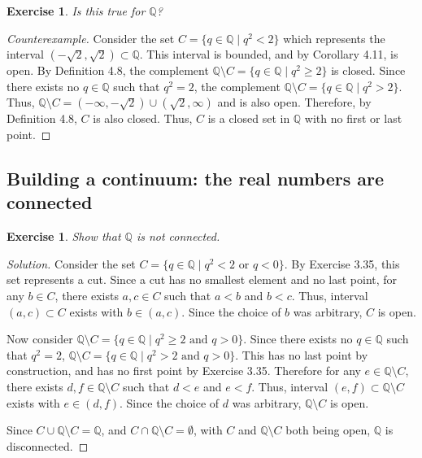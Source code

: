 \documentclass{amsart}
\newtheorem{exercise}[theorem]{Exercise}
\newcommand{\Q}{\mathbb Q}
\newcommand{\1}{\mathds{1}}
\numberwithin{equation}{section}
\numberwithin{theorem}{section}
\begin{document}
\begin{exercise}  Is this true for $\mathbb{Q}$?
\end{exercise}

\begin{proof}[Counterexample]
	Consider the set $C = \{q\in \Q \mid q^2 < 2\}$ which represents the interval $(-\sqrt{2},\sqrt{2}) \subset \Q$. This interval is bounded, and by Corollary 4.11, is open. By Definition 4.8, the complement $\Q\setminus C = \{q\in \Q \mid q^2 \ge 2\}$ is closed. Since there exists no $q\in \Q$ such that $q^2 = 2$, the complement $\Q\setminus C = \{q\in \Q \mid q^2 > 2\}$. Thus, $\Q\setminus C = (-\infty, -\sqrt{2}) \cup (\sqrt{2},\infty)$ and is also open. Therefore, by Definition 4.8, $C$ is also closed. Thus, $C$ is a closed set in $\Q$ with no first or last point. 
\end{proof}

\subsection{Building a continuum: the real numbers are connected}

\begin{exercise}
	Show that $\Q$ is not connected.
\end{exercise}

\begin{proof}[Solution]
	Consider the set $C = \{q\in \Q \mid q^2 < 2 \text{ or } q<0 \}$. By Exercise 3.35, this set represents a cut. Since a cut has no smallest element and no last point, for any $b\in C$, there exists $a,c\in C$ such that $a<b$ and $b<c$. Thus, interval $(a,c)\subset C$ exists with $b\in (a,c)$. Since the choice of $b$ was arbitrary, $C$ is open.
	
	Now consider $\Q \setminus C = \{q\in \Q \mid q^2 \ge 2 \text{ and } q>0 \}$. Since there exists no $q\in \Q$ such that $q^2 = 2$, $\Q \setminus C = \{q\in \Q \mid q^2 > 2 \text{ and } q>0 \}$. This has no last point by construction, and has no first point by Exercise 3.35. Therefore for any $e\in \Q\setminus C$, there exists $d,f\in \Q\setminus C$ such that $d<e$ and $e<f$. Thus, interval $(e,f)\subset \Q\setminus C$ exists with $e\in (d,f)$. Since the choice of $d$ was arbitrary, $\Q\setminus C$ is open.
	
	Since $C \cup \Q\setminus C = \Q$, and $C \cap \Q\setminus C = \emptyset$, with $C$ and $\Q\setminus C$ both being open, $\Q$ is disconnected. 
\end{proof}	
\end{document}
